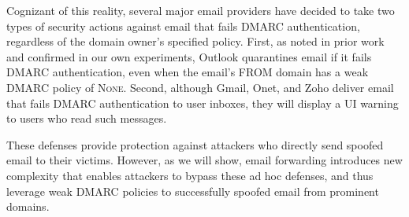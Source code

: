 %

Cognizant of this reality, several major email providers have decided to take two types of security actions against email that fails DMARC authentication, regardless of the domain owner's specified policy.
First, as noted in prior work~\cite{hu_end--end_nodate} and confirmed in our own experiments, Outlook quarantines email if it fails DMARC authentication, even when the email's \textsc{FROM} domain has a weak DMARC policy of \textsc{None}.
Second, although Gmail, Onet, and Zoho deliver email that fails DMARC authentication to user inboxes, they will display a UI warning to users who read such messages.

These defenses provide protection against attackers who directly send spoofed email to their victims.  However, as we will show,
email forwarding introduces new complexity that enables attackers to bypass these ad hoc defenses, and thus leverage weak DMARC policies to successfully spoofed email from prominent domains.

